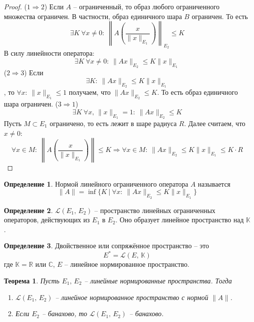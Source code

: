 \documentclass[a4paper,12pt]{article}
\renewcommand{\leq}{\ensuremath{\leqslant}}
\theoremstyle{plain}
\newtheorem{theorem}{Теорема}[section]
\theoremstyle{definition}
\newtheorem{definition}{Определение}[section]
\theoremstyle{remark}
\begin{document}
\begin{proof}
	($1 \Rightarrow 2$) Если $A$ -- ограниченный, то образ любого ограниченного множества ограничен. В частности, образ единичного шара $B$ ограничен. То есть
	\[
		\exists K \: \forall x \neq 0 :\: \left\|A\left(\frac{x}{\|x\|_{E_1}}\right)\right\|_{E_2} \leq K
	\]
	В силу линейности оператора:
	\[
		\exists K \: \forall x \neq 0 :\: \|Ax\|_{E_2} \leq K\|x\|_{E_1}
	\]
	($2 \Rightarrow 3$) Если
	\[
		\exists K :\: \|Ax\|_{E_2} \leq K\|x\|_{E_1}
	\]
	, то $\forall x :\: \|x\|_{E_1} \leq 1$ получаем, что $\|Ax\|_{E_2} \leq K$. То есть образ единичного шара ограничен.
	($3 \Rightarrow 1$)
	\[
		\exists K \: \forall x,\, \|x\|_{E_1} = 1 :\: \|Ax\|_{E_2} \leq K
	\]
	Пусть $M \subset E_1$ ограничено, то есть лежит в шаре радиуса $R$. Далее считаем, что $x \neq 0$:
	\[
		\forall x \in M :\: \left\|A\left(\frac{x}{\|x\|_{E_1}}\right)\right\| \leq K \Rightarrow \forall x \in M :\: \|Ax\|_{E_2} \leq K\|x\|_{E_1} \leq K\cdot R
	\]
\end{proof}

\begin{definition}
	Нормой линейного ограниченного оператора $A$ называется
	\[
		\|A\| = \inf\{K \:\vert\: \forall x :\: \|Ax\|_{E_2} \leq K\|x\|_{E_1}\}
	\]
\end{definition}

\begin{definition}
	$\mathcal{L}(E_1,\, E_2)$ -- пространство линейных ограниченных операторов, действующих из $E_1$ в $E_2$. Оно образует линейное пространство над $\mathbb{K}$.
\end{definition}

\begin{definition}
	Двойственное или сопряжённое пространство -- это
	\[
		E^* = \mathcal{L}(E,\, \mathbb{K})
	\]
	где $\mathbb{K} = \mathbb{R}$ или $\mathbb{C}$, $E$ -- линейное нормированное пространство.
\end{definition}

\begin{theorem}
	Пусть $E_1,\, E_2$ -- линейные нормированные пространства. Тогда
	\begin{enumerate}
		\item $\mathcal{L}(E_1,\,E_2)$ -- линейное нормированное пространство с нормой $\|A\|$.
		\item Если $E_2$ -- банахово, то $\mathcal{L}(E_1,\, E_2)$ -- банахово.
	\end{enumerate}
\end{theorem}
\end{document}
